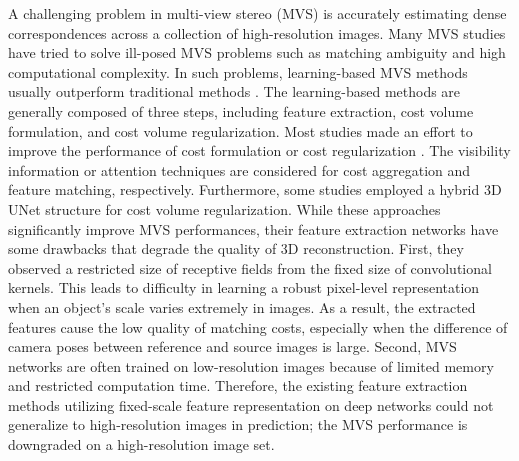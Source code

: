 \documentclass{article} \usepackage{iclr2022_conference,times}
\begin{document}
A challenging problem in multi-view stereo (MVS) is accurately estimating dense correspondences across a collection of high-resolution images. Many MVS studies have tried to solve ill-posed MVS problems such as matching ambiguity and high computational complexity. In such problems, learning-based MVS methods \citep{chen2019point,luo2019p,chen2020visibility,xu2020learning,xue2019mvscrf} usually outperform traditional methods \citep{galliani2015massively,schonberger2016structure}. The learning-based methods are generally composed of three steps, including feature extraction, cost volume formulation, and cost volume regularization. Most studies made an effort to improve the performance of cost formulation \citep{luo2019p, zhang2020visibility, xu2020pvsnet, yi2020pyramid} or cost regularization \citep{luo2019p,luo2020attention,wang2021patchmatchnet}. The visibility information \citep{zhang2020visibility,xu2020pvsnet} or attention techniques \citep{yi2020pyramid, luo2020attention} are considered for cost aggregation and feature matching, respectively. Furthermore, some studies employed a hybrid 3D UNet structure \citep{luo2019p,sormann2020bp} for cost volume regularization. While these approaches significantly improve MVS performances, their feature extraction networks have some drawbacks that degrade the quality of 3D reconstruction. First, they observed a restricted size of receptive fields from the fixed size of convolutional kernels. This leads to difficulty in learning a robust pixel-level representation when an object’s scale varies extremely in images. As a result, the extracted features cause the low quality of matching costs, especially when the difference of camera poses between reference and source images is large. Second, MVS networks are often trained on low-resolution images because of limited memory and restricted computation time. Therefore, the existing feature extraction methods utilizing fixed-scale feature representation on deep networks could not generalize to high-resolution images in prediction; the MVS performance is downgraded on a high-resolution image set. 
\end{document}
